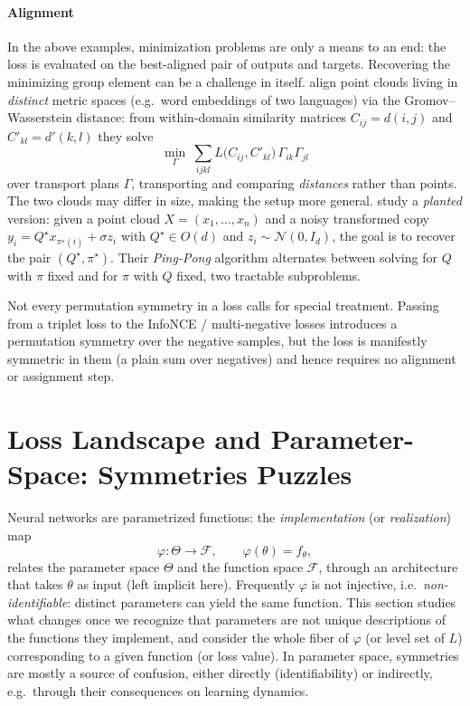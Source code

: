 \documentclass[mathematics,review,submit,moreauthors]{Definitions/mdpi}
\begin{document}
\paragraph{Alignment}\label{sec:framework-criterion-alignment}
In the above examples, minimization problems are only a means to an end: the loss is evaluated on the best-aligned pair of outputs and targets.
Recovering the minimizing group element can be a challenge in itself.
\citet{alvarez-melis2018p2cemnlp} align point clouds living in \emph{distinct} metric spaces (e.g.\ word embeddings of two languages) via the Gromov--Wasserstein distance: from within-domain similarity matrices $C_{ij}=d(i,j)$ and $C'_{kl}=d'(k,l)$ they solve
$$
\min_{\Gamma}\ \sum_{ijkl} L\big(C_{ij}, C'_{kl}\big)\,\Gamma_{ik}\Gamma_{jl}
$$
over transport plans $\Gamma$, transporting and comparing \emph{distances} rather than points.
The two clouds may differ in size, making the setup more general.
\citet{even2024} study a \emph{planted} version: given a point cloud $X=(x_1,\dots,x_n)$ and a noisy transformed copy $y_i=Q^\star x_{\pi^\star(i)}+\sigma z_i$ with $Q^\star\in O(d)$ and $z_i\sim\mathcal{N}(0,I_d)$, the goal is to recover the pair $(Q^\star,\pi^\star)$.
Their \emph{Ping-Pong} algorithm alternates between solving for $Q$ with $\pi$ fixed and for $\pi$ with $Q$ fixed, two tractable subproblems.

\begin{Remark}
Not every permutation symmetry in a loss calls for special treatment.
Passing from a triplet loss to the InfoNCE / multi-negative losses \citep{oord2018a} introduces a permutation symmetry over the negative samples, but the loss is manifestly symmetric in them (a plain sum over negatives) and hence requires no alignment or assignment step.
\end{Remark}

\section{Loss Landscape and Parameter-Space: Symmetries Puzzles}\label{sec:parameter-space-symmetries}

Neural networks are parametrized functions: the \emph{implementation} (or \emph{realization}) map
\begin{equation}\label{eq:implementation-map}
    \varphi:\Theta\to\mathcal{F}, \qquad \varphi(\theta)=f_\theta,
\end{equation}
relates the parameter space $\Theta$ and the function space $\mathcal F$, through an architecture that takes $\theta$ as input (left implicit here).
Frequently $\varphi$ is not injective, i.e.\ \emph{non-identifiable}: distinct parameters can yield the same function.
This section studies what changes once we recognize that parameters are not unique descriptions of the functions they implement, and consider the whole fiber of $\varphi$ (or level set of $L$) corresponding to a given function (or loss value).
In parameter space, symmetries are mostly a source of confusion, either directly (identifiability) or indirectly, e.g.\ through their consequences on learning dynamics.
\end{document}
